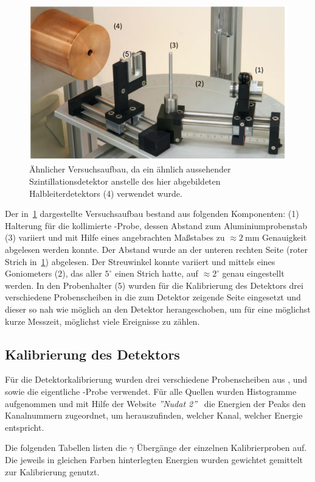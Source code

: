\documentclass[draft, slug=CS, room=Andreas-Schubert-Bau\,\ Labor\ 406,
supervisor=Juliane\ Volkmer, coursedate=29.\ 11.\ 2019]{../../Lab_Report_LaTeX/lab_report}
\newcommand{\am}{\ce{^241Am}}
\begin{document}
\begin{figure}[H]\centering
        \includegraphics[width=.7\columnwidth]{./pictures/versuchsaufbau.png}
        \caption{Ähnlicher Versuchsaufbau, da ein ähnlich aussehender Szintillationsdetektor anstelle
                des hier abgebildeten Halbleiterdetektors (4) verwendet wurde.}
        \label{fig:versuchsaufbau}
\end{figure}

Der in~\ref{fig:versuchsaufbau} dargestellte Versuchsaufbau bestand aus folgenden Komponenten:
(1) Halterung für die kollimierte \am{}-Probe, dessen Abstand zum Aluminiumprobenstab (3)
variiert und mit Hilfe eines angebrachten Maßstabes zu \(\approx \SI{2}{\milli\metre}\)
Genauigkeit abgelesen werden konnte. Der Abstand wurde an der unteren rechten Seite (roter Strich
in~\ref{fig:versuchsaufbau}) abgelesen. Der Streuwinkel konnte variiert und mittels eines
Goniometers (2), das aller \(5^\circ\) einen Strich hatte, auf \(\approx 2^\circ\) genau
eingestellt werden. In den Probenhalter (5) wurden für die Kalibrierung des Detektors drei
verschiedene Probenscheiben in die zum Detektor zeigende Seite eingesetzt und dieser so nah wie
möglich an den Detektor herangeschoben, um für eine möglichst kurze Messzeit, möglichst viele Ereignisse zu zählen.

\subsection{Kalibrierung des Detektors}
\label{sec:kalib}

Für die Detektorkalibrierung wurden drei verschiedene Probenscheiben aus ,
 und  sowie die eigentliche \am{}-Probe verwendet.
Für alle Quellen wurden Histogramme aufgenommen und mit Hilfe der Website \emph{''Nudat 2''}~\cite{nudat}
die Energien der Peaks den Kanalnummern zugeordnet, um herauszufinden, welcher Kanal, welcher
Energie entspricht.

Die folgenden Tabellen listen die \(\gamma\) \"Uberg\"ange der
einzelnen Kalibrierproben auf. Die jeweils in gleichen Farben
hinterlegten Energien wurden gewichtet gemittelt zur Kalibrierung genutzt.
\end{document}
